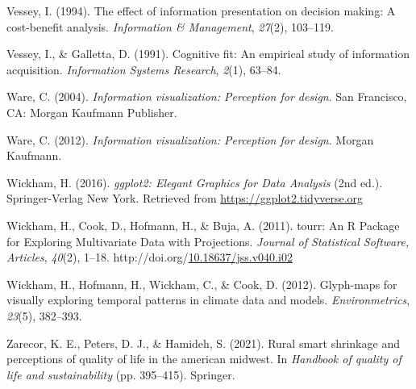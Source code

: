 \documentclass[print]{nuthesis}
\newlength{\cslhangindent}
\newenvironment{CSLReferences}[2]%
{\setlength{\parindent}{0pt}%
\everypar{\setlength{\hangindent}{\cslhangindent}}\ignorespaces}%
{\par}
\begin{document}
\begin{CSLReferences}{1}{0}
\leavevmode{}%
Vessey, I. (1994). The effect of information presentation on decision making: A cost-benefit analysis. \emph{Information \& Management}, \emph{27}(2), 103--119.

\leavevmode{}%
Vessey, I., \& Galletta, D. (1991). Cognitive fit: An empirical study of information acquisition. \emph{Information Systems Research}, \emph{2}(1), 63--84.

\leavevmode{}%
Ware, C. (2004). \emph{Information visualization: Perception for design}. San Francisco, CA: Morgan Kaufmann Publisher.

\leavevmode{}%
Ware, C. (2012). \emph{Information visualization: Perception for design}. Morgan Kaufmann.

\leavevmode{}%
Wickham, H. (2016). \emph{{ggplot2: Elegant Graphics for Data Analysis}} (2nd ed.). Springer-Verlag New York. Retrieved from \url{https://ggplot2.tidyverse.org}

\leavevmode{}%
Wickham, H., Cook, D., Hofmann, H., \& Buja, A. (2011). {tourr: An R Package for Exploring Multivariate Data with Projections}. \emph{Journal of Statistical Software, Articles}, \emph{40}(2), 1--18. http://doi.org/\href{https://doi.org/10.18637/jss.v040.i02}{10.18637/jss.v040.i02}

\leavevmode{}%
Wickham, H., Hofmann, H., Wickham, C., \& Cook, D. (2012). Glyph-maps for visually exploring temporal patterns in climate data and models. \emph{Environmetrics}, \emph{23}(5), 382--393.

\leavevmode{}%
Zarecor, K. E., Peters, D. J., \& Hamideh, S. (2021). Rural smart shrinkage and perceptions of quality of life in the american midwest. In \emph{Handbook of quality of life and sustainability} (pp. 395--415). Springer.

\end{CSLReferences}


\backmatter

% 






\end{document}
